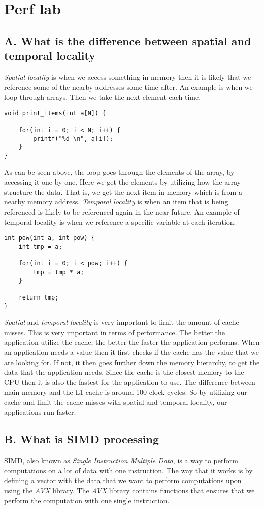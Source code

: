 \section{Perf lab}

\subsection{A. What is the difference between spatial and temporal locality}
\textit{Spatial locality} is when we access something in memory then it is likely that we reference some of the nearby addresses some time after. An example is
when we loop through arrays. Then we take the next element each time.
\begin{lstlisting}
void print_items(int a[N]) {

    for(int i = 0; i < N; i++) {
        printf("%d \n", a[i]);
    }
}
\end{lstlisting}
As can be seen above, the loop goes through the elements of the array, by accessing it one by one. Here we get the elements
by utilizing how the array structure the data. That is, we get the next item in memory which is from a nearby memory address.
\textit{Temporal locality} is when an item that is being referenced is likely to be 
referenced again in the near future. An example of temporal locality is when we reference a specific variable
at each iteration.
\begin{lstlisting}
int pow(int a, int pow) {
    int tmp = a;

    for(int i = 0; i < pow; i++) {
        tmp = tmp * a;
    }

    return tmp;
}
\end{lstlisting}
\textit{Spatial} and \textit{temporal locality} is very important to limit the amount of cache misses. This is very important in terms of performance.
The better the application utilize the cache, the better the faster the application performs. When an application needs a value then it first checks if the cache has
the value that we are looking for. If not, it then goes further down the memory hierarchy, to get the data that the application needs. 
Since the cache is the closest memory to the CPU then it is also the fastest for the application to use. The difference between main memory and the L1 cache is around 100 clock cycles.
So by utilizing our cache and limit the cache misses with spatial and temporal locality, our applications run faster.

\subsection{B. What is SIMD processing}
SIMD, also known as \textit{Single Instruction Multiple Data}, is a way to perform computations on a lot of data
with one instruction. The way that it works is by defining a vector with the data that we want to perform computations
upon using the \textit{AVX} library. The \textit{AVX} library contains functions that ensures that we perform the computation 
with one single instruction. 

